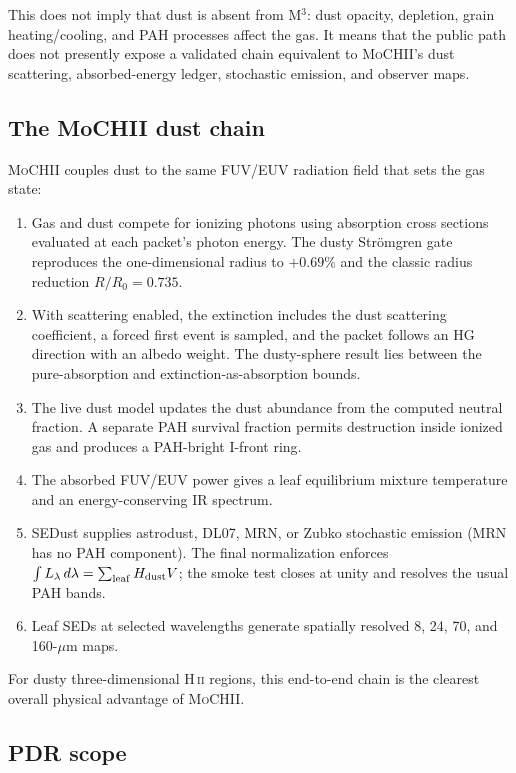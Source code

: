 \documentclass[english,a4paper]{my_memo}
\newcommand{\MoCHII}{\textsc{MoCHII}}
\newcommand{\Mthree}{M$^3$}
\begin{document}
This does not imply that dust is absent from \Mthree{}: dust opacity,
depletion, grain heating/cooling, and PAH processes affect the gas.  It
means that the public path does not presently expose a validated chain
equivalent to \MoCHII{}'s dust scattering, absorbed-energy ledger,
stochastic emission, and observer maps.

\subsection{The MoCHII dust chain}

\MoCHII{} couples dust to the same FUV/EUV radiation field that sets the
gas state:

\begin{enumerate}[leftmargin=2em]
\item Gas and dust compete for ionizing photons using absorption cross
  sections evaluated at each packet's photon energy.  The dusty Str\"omgren gate reproduces the
  one-dimensional radius to $+0.69\%$ and the classic radius reduction
  $R/R_0=0.735$.
\item With scattering enabled, the extinction includes the dust scattering
  coefficient, a forced first event is sampled, and the packet follows an
  HG direction with an albedo weight.  The dusty-sphere result lies between
  the pure-absorption and extinction-as-absorption bounds.
\item The live dust model updates the dust abundance from the computed
  neutral fraction.  A separate PAH survival fraction permits destruction
  inside ionized gas and produces a PAH-bright I-front ring.
\item The absorbed FUV/EUV power gives a leaf equilibrium mixture
  temperature and an energy-conserving IR spectrum.
\item SEDust supplies astrodust, DL07, MRN, or Zubko stochastic emission
  (MRN has no PAH component).  The
  final normalization enforces
  $\int L_\lambda\,d\lambda=\sum_{\rm leaf}H_{\rm dust}V$; the smoke test
  closes at unity and resolves the usual PAH bands.
\item Leaf SEDs at selected wavelengths generate spatially resolved 8, 24,
  70, and 160-$\mu$m maps.
\end{enumerate}

For dusty three-dimensional H\,\textsc{ii} regions, this end-to-end chain
is the clearest overall physical advantage of \MoCHII{}.

\subsection{PDR scope}
\end{document}
